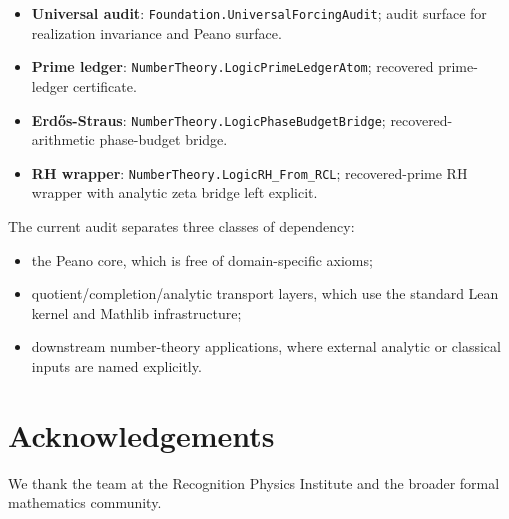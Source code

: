 \documentclass[11pt,a4paper]{article}
\theoremstyle{definition}
\theoremstyle{remark}
\begin{document}
\begin{itemize}[leftmargin=2em]
      \texttt{Foundation.CategoricalLogicRealization}, and
      \texttt{Foundation.PhysicsLogicRealization}; Boolean, periodic modular,
      ordered faithful, Lawvere-style, and identity-tick realization hooks.
\item \textbf{Universal audit}: \texttt{Foundation.UniversalForcingAudit};
      audit surface for realization invariance and Peano surface.
\item \textbf{Prime ledger}: \texttt{NumberTheory.LogicPrimeLedgerAtom};
      recovered prime-ledger certificate.
\item \textbf{Erd\H{o}s-Straus}: \texttt{NumberTheory.LogicPhaseBudgetBridge};
      recovered-arithmetic phase-budget bridge.
\item \textbf{RH wrapper}: \texttt{NumberTheory.LogicRH\_From\_RCL};
      recovered-prime RH wrapper with analytic zeta bridge left explicit.
\end{itemize}
\endgroup

The current audit separates three classes of dependency:
\begin{itemize}
\item the Peano core, which is free of domain-specific axioms;
\item quotient/completion/analytic transport layers, which use the
standard Lean kernel and Mathlib infrastructure;
\item downstream number-theory applications, where external analytic
or classical inputs are named explicitly.
\end{itemize}

\section*{Acknowledgements}

We thank the team at the Recognition Physics Institute and the broader
formal mathematics community.
\end{document}

